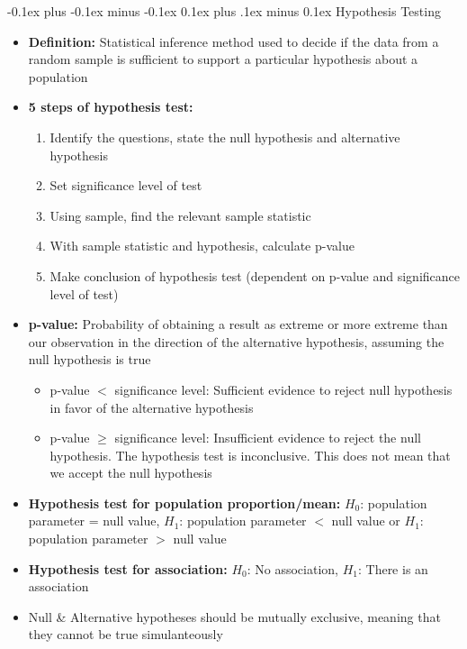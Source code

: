 \documentclass[landscape]{article}
\makeatletter
\renewcommand{\subsection}{\@startsection{subsection}{2}{0mm}%
  {-0.1ex plus -0.1ex minus -0.1ex}%
  {0.1ex plus .1ex minus 0.1ex}%
{\normalfont\scriptsize\bfseries}}
\makeatother
\begin{document}
\begin{multicols*}{5}
    \subsection{Hypothesis Testing}
    \begin{itemize}
      \item \textbf{Definition:} Statistical inference method used to decide if the data from a random sample is sufficient to support a particular hypothesis about a population
      \item \textbf{5 steps of hypothesis test:}
      \begin{enumerate}
        \item Identify the questions, state the null hypothesis and alternative hypothesis
        \item Set significance level of test
        \item Using sample, find the relevant sample statistic
        \item With sample statistic and hypothesis, calculate p-value
        \item Make conclusion of hypothesis test (dependent on p-value and significance level of test)
      \end{enumerate}
      \item \textbf{p-value:} Probability of obtaining a result as extreme or more extreme than our observation in the direction of the alternative hypothesis, assuming the null hypothesis is true
      \begin{itemize}
        \item p-value $<$ significance level: Sufficient evidence to reject null hypothesis in favor of the alternative hypothesis
        \item p-value $\geq$ significance level: Insufficient evidence to reject the null hypothesis. The hypothesis test is inconclusive. This does not mean that we accept the null hypothesis
      \end{itemize}
      \item \textbf{Hypothesis test for population proportion/mean:} $H_0$: population parameter = null value, $H_1$: population parameter $<$ null value or $H_1$: population parameter $>$ null value
      \item \textbf{Hypothesis test for association:} $H_0$: No association, $H_1$: There is an association
      \item Null \& Alternative hypotheses should be mutually exclusive, meaning that they cannot be true simulanteously
    \end{itemize}


\end{multicols*}
\end{document}
